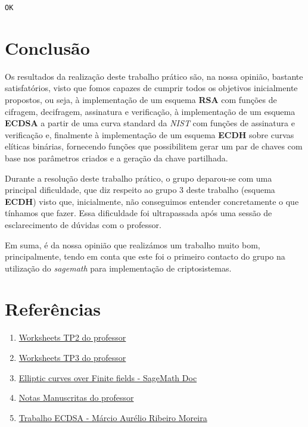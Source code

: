 \documentclass[11pt]{article}
\providecommand{\tightlist}{%
      \setlength{\itemsep}{0pt}\setlength{\parskip}{0pt}}
\begin{document}
    \begin{Verbatim}[commandchars=\\\{\}]
OK

    \end{Verbatim}

    \section{Conclusão}\label{conclusuxe3o}

    Os resultados da realização deste trabalho prático são, na nossa
opinião, bastante satisfatórios, visto que fomos capazes de cumprir
todos os objetivos inicialmente propostos, ou seja, à implementação de
um esquema \textbf{RSA} com funções de cifragem, decifragem, assinatura
e verificação, à implementação de um esquema \textbf{ECDSA} a partir de
uma curva standard da \emph{NIST} com funções de assinatura e
verificação e, finalmente à implementação de um esquema \textbf{ECDH}
sobre curvas elíticas binárias, fornecendo funções que possibilitem
gerar um par de chaves com base nos parâmetros criados e a geração da
chave partilhada.

Durante a resolução deste trabalho prático, o grupo deparou-se com uma
principal dificuldade, que diz respeito ao grupo 3 deste trabalho
(esquema \textbf{ECDH}) visto que, inicialmente, não conseguimos
entender concretamente o que tínhamos que fazer. Essa dificuldade foi
ultrapassada após uma sessão de esclarecimento de dúvidas com o
professor.

Em suma, é da nossa opinião que realizámos um trabalho muito bom,
principalmente, tendo em conta que este foi o primeiro contacto do grupo
na utilização do \emph{sagemath} para implementação de criptosistemas.

\pagebreak

    \section{Referências}\label{referuxeancias}

    \begin{enumerate}
\def\labelenumi{\arabic{enumi}.}
\tightlist
\item
  \href{https://www.dropbox.com/sh/f0j9adiaw4v3deb/AADIuhV5bL5qqzbM_RLS-gMXa/WorkSheets/TP2?dl=0\&subfolder_nav_tracking=1}{Worksheets
  TP2 do professor}
\item
  \href{https://www.dropbox.com/sh/f0j9adiaw4v3deb/AACsRYRoRg46CR1njyZ_nJtza/WorkSheets/TP3?dl=0\&subfolder_nav_tracking=1}{Worksheets
  TP3 do professor}
\item
  \href{http://doc.sagemath.org/html/en/reference/curves/sage/schemes/elliptic_curves/ell_finite_field.html}{Elliptic
  curves over Finite fields - SageMath Doc}
\item
  \href{https://www.dropbox.com/sh/f0j9adiaw4v3deb/AAC5XUPllha9QXo-vVxTHqXna/Docs/NOTAS_MANUSCRITAS?dl=0\&subfolder_nav_tracking=1}{Notas
  Manuscritas do professor}
\item
  \href{http://www.inf.ufsc.br/~bosco.sobral/ensino/ine5630/material-cripto-seg/crpt_trabalho_ecdsa.pdf}{Trabalho
  ECDSA - Márcio Aurélio Ribeiro Moreira}
\end{enumerate}


    
    
    
    
\end{document}
